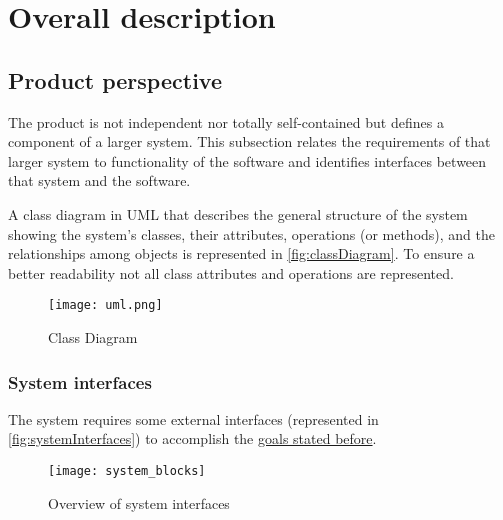 \section{Overall description}

\subsection{Product perspective}
	
	The product is not independent nor totally self-contained but defines a component of a larger system. This subsection relates the requirements of that larger system to functionality of the software and identifies interfaces between that system and the software.
	
	A class diagram in UML that describes the general structure of the system showing the system's classes, their attributes, operations (or methods), and the relationships among objects is represented in \autoref{fig:classDiagram}. To ensure a better readability not all class attributes and operations are represented. \newline \newline
		
	\begin{figure}[h]
			\centering
			\texttt{[image: uml.png]}
			\caption{
				\label{fig:classDiagram} 
				Class Diagram
			}
		\end{figure}

	\subsubsection{System interfaces}
	\label{sec:systemInterfaces}
		The system requires some external interfaces (represented in \autoref{fig:systemInterfaces}) to accomplish the \hyperref[sec:goals]{goals stated before}. \newline \newline
		\begin{figure}[h]
			\centering
			\texttt{[image: system\_blocks]}
			\caption{
				\label{fig:systemInterfaces} 
				Overview of system interfaces
			}
		\end{figure} 
\clearpage			
